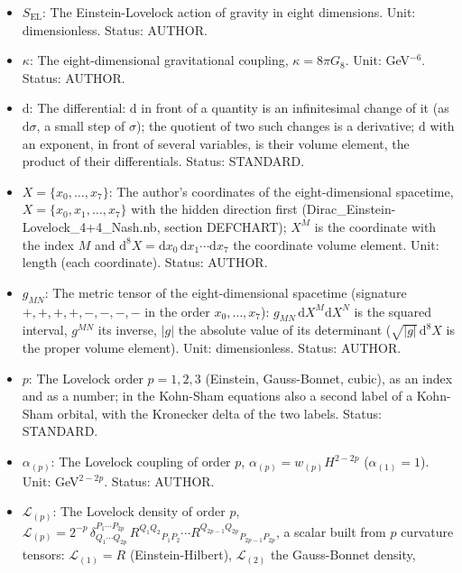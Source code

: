 \documentclass[
  10pt,
]{article}
\providecommand{\tightlist}{%
  \setlength{\itemsep}{0pt}\setlength{\parskip}{0pt}}
\begin{document}
\begin{itemize}
\tightlist
\item
  \(S_{\mathrm{EL}}\): The Einstein-Lovelock action of gravity in eight
  dimensions. Unit: dimensionless. Status: AUTHOR.
\item
  \(\kappa\): The eight-dimensional gravitational coupling,
  \(\kappa = 8\pi G_8\). Unit: GeV\(^{-6}\). Status: AUTHOR.
\item
  \(\mathrm{d}\): The differential: \(\mathrm{d}\) in front of a
  quantity is an infinitesimal change of it (as \(\mathrm{d}\sigma\), a
  small step of \(\sigma\)); the quotient of two such changes is a
  derivative; \(\mathrm{d}\) with an exponent, in front of several
  variables, is their volume element, the product of their
  differentials. Status: STANDARD.
\item
  \(X = \{x_0, \dots, x_7\}\): The author's coordinates of the
  eight-dimensional spacetime, \(X = \{x_0, x_1, \dots, x_7\}\) with the
  hidden direction first (Dirac\_Einstein-Lovelock\_4+4\_Nash.nb,
  section DEFCHART); \(X^M\) is the coordinate with the index \(M\) and
  \(\mathrm{d}^8X = \mathrm{d}x_0\,\mathrm{d}x_1\cdots\mathrm{d}x_7\)
  the coordinate volume element. Unit: length (each coordinate). Status:
  AUTHOR.
\item
  \(g_{MN}\): The metric tensor of the eight-dimensional spacetime
  (signature \(+,+,+,+,-,-,-,-\) in the order \(x_0, \dots, x_7\)):
  \(g_{MN}\,\mathrm{d}X^M\mathrm{d}X^N\) is the squared interval,
  \(g^{MN}\) its inverse, \(\lvert g\rvert\) the absolute value of its
  determinant (\(\sqrt{\lvert g\rvert}\,\mathrm{d}^8X\) is the proper
  volume element). Unit: dimensionless. Status: AUTHOR.
\item
  \(p\): The Lovelock order \(p = 1, 2, 3\) (Einstein, Gauss-Bonnet,
  cubic), as an index and as a number; in the Kohn-Sham equations also a
  second label of a Kohn-Sham orbital, with the Kronecker delta of the
  two labels. Status: STANDARD.
\item
  \(\alpha_{(p)}\): The Lovelock coupling of order \(p\),
  \(\alpha_{(p)} = w_{(p)}H^{2-2p}\) (\(\alpha_{(1)} = 1\)). Unit:
  GeV\(^{2-2p}\). Status: AUTHOR.
\item
  \(\mathcal{L}_{(p)}\): The Lovelock density of order \(p\),
  \(\mathcal{L}_{(p)} = 2^{-p}\,\delta^{P_1\cdots P_{2p}}_{Q_1\cdots Q_{2p}}\,R^{Q_1Q_2}{}_{P_1P_2}\cdots R^{Q_{2p-1}Q_{2p}}{}_{P_{2p-1}P_{2p}}\),
  a scalar built from \(p\) curvature tensors: \(\mathcal{L}_{(1)} = R\)
  (Einstein-Hilbert), \(\mathcal{L}_{(2)}\) the Gauss-Bonnet density,

\end{itemize}
\end{document}

